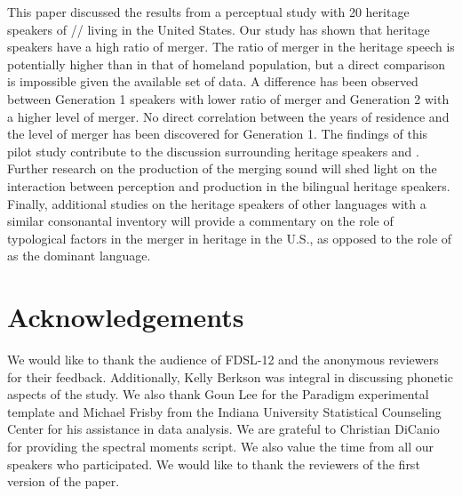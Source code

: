 \documentclass[output=paper,modfonts,newtxmath,hidelinks,]{langscibook}
\begin{document}
This paper discussed the results from a perceptual study with 20 heritage speakers of // living in the United States. Our study has shown that heritage speakers have a high ratio of merger. The ratio of merger in the heritage speech is potentially higher than in that of homeland population, but a direct comparison is impossible given the available set of data. {A} difference has been observed between Generation 1 speakers with lower ratio of merger and Generation 2 with a higher level of merger. No direct correlation between the years of residence and the level of merger has been discovered for Generation 1. The findings of this pilot study contribute to the discussion surrounding heritage speakers and . Further research on the production of the merging sound will shed light on the interaction between perception and production in the bilingual heritage speakers. Finally, additional studies on the heritage speakers of other languages with a similar consonantal inventory will provide a commentary on the role of typological factors in the  merger in heritage  in the U.S., as opposed to the role of  as the dominant language.


\section*{Acknowledgements}

We would like to thank the audience of FDSL-12 and the anonymous reviewers for their feedback. Additionally, Kelly Berkson was integral in discussing phonetic aspects of the study. We also thank Goun Lee for the Paradigm experimental template and Michael Frisby from the Indiana University Statistical Counseling Center for his assistance in data analysis. We are grateful to Christian DiCanio for providing the spectral moments script. We also value the time from all our speakers who participated. We would like to thank the reviewers of the first version of the paper.

\largerpage
\sloppy
\printbibliography[heading=subbibliography,notkeyword=this]
\end{document}

